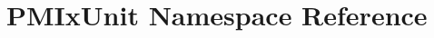 \hypertarget{namespace_p_m_ix_unit}{\section{P\-M\-Ix\-Unit Namespace Reference}
\label{namespace_p_m_ix_unit}
}
